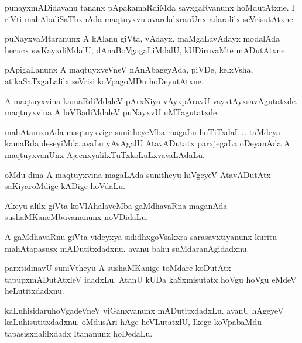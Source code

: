 \documentclass{article}
\begin{document}
\begin{mn}
punayxmADidavanu tananx pApakamaRdiMda savxgaRvanunx hoMdutAtxne.  I riVti 
mahAbaliSaThxnAda maqtuyxvu avarelalxranUnx  adaralilx seVrisutAtxne.
\end{mn}

\begin{mn}
puNayxvaMtaranunx A kAlanu giVta, vAdayx, maMgaLavAdayx modalAda hecucx swKayxdiMdalU, 
dAnaBoVgagaLiMdalU, kUDiruvaMte mADutAtxne.
\end{mn}

\begin{mn}
pApigaLanunx A maqtuyxveVneV  nAnAbageyAda, piVDe, kelxVsha, atikaSaTxgaLalilx 
seVrisi koVpagoMDu hoDeyutAtxne. 
\end{mn}

\begin{mn}
A maqtuyxvina kamaRdiMdaleV pArxNiya vAyxpAravU vayxtAyxsavAgutatxde.  
maqtuyxvina A loVBadiMdaleV puNayxvU uMTagutatxde.
\end{mn}

\begin{mn}
mahAtamxnAda maqtuyxvige sunitheyeMba magaLu huTiTxdaLu. taMdeya kamaRda 
deseyiMda avaLu yAvAgalU AtavADutatx parxjegaLa oDeyanAda A maqtuyxvanUnx 
AjecnxyalilxTuTxkoLuLxvavaLAdaLu.
\end{mn}

\begin{mn}
oMdu dina A maqtuyxvina magaLAda sunitheyu hiVgeyeV AtavADutAtx saKiyaroMdige kADige hoVdaLu.
\end{mn}

\begin{mn}
Akeyu alilx giVta koVlAhalaveMba gaMdhavaRna maganAda sushaMKaneMbuvananunx noVDidaLu.
\end{mn}

\begin{mn}
A gaMdhavaRnu giVta videyxya sididhxgoVsakxra sarasavxtiyanunx kuritu 
mahAtapasusx mADutitxdadxnu. avanu bahu suMdaranAgidadxnu.
\end{mn}

\begin{mn}
parxtidinavU suniVtheyu A sushaMKanige toMdare koDutAtx tapupxmADutAtxleV 
idadxLu.  AtanU kUDa kaSxmisutatx hoVgu hoVgu eMdeV heLutitxdadxnu.
\end{mn}

\begin{mn}
kaLuhisidaruhoVgadeVneV viGanxvanunx mADutitxdadxLu. avanU hAgeyeV kaLuhisutitxdadxnu.  
oMdusAri hAge heVLutatxlU,  Ikege koVpabaMdu tapasisxnalilxdadx Itananunx hoDedaLu.
\end{mn}
\end{document}
